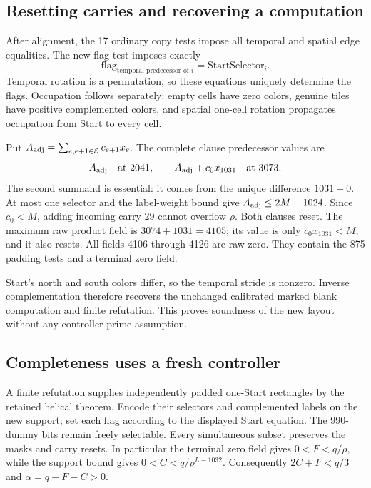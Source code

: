\documentclass[10pt,letterpaper]{article}
\theoremstyle{remark}\newtheorem{remark}[theorem]{Remark}
\begin{document}
\subsection{Resetting carries and recovering a computation}

After alignment, the 17 ordinary copy tests impose all temporal and
spatial edge equalities. The new flag test imposes exactly
\[
 \mathrm{flag}_{\text{temporal predecessor of }i}
     =\mathrm{StartSelector}_i.
\]
Temporal rotation is a permutation, so these equations uniquely determine
the flags. Occupation follows separately: empty cells have zero colors,
genuine tiles have positive complemented colors, and spatial one-cell
rotation propagates occupation from Start to every cell.

Put $A_{\rm adj}=\sum_{e,e+1\in\mathcal E}c_{e+1}x_e$. The complete
clause predecessor values are
\[
 A_{\rm adj}\quad\text{at 2041},\qquad
 A_{\rm adj}+c_0x_{1031}\quad\text{at 3073}.
\]
The second summand is essential: it comes from the unique difference
$1031-0$. At most one selector and the label-weight bound give
$A_{\rm adj}\le2M-1024$. Since $c_0<M$, adding incoming carry 29 cannot
overflow $\rho$. Both clauses reset. The maximum raw product field is
$3074+1031=4105$; its value is only $c_0x_{1031}<M$, and it also resets.
All fields 4106 through 4126 are raw zero. They contain the 875 padding
tests and a terminal zero field.

Start's north and south colors differ, so the temporal stride is nonzero.
Inverse complementation therefore recovers the unchanged calibrated
marked blank computation and finite refutation. This proves soundness of
the new layout without any controller-prime assumption.

\subsection{Completeness uses a fresh controller}

A finite refutation supplies independently padded one-Start rectangles
by the retained helical theorem. Encode their selectors and complemented
labels on the new support; set each flag according to the displayed
Start equation. The 990-dummy bits remain freely selectable. Every
simultaneous subset preserves the masks and carry resets. In particular
the terminal zero field gives $0<F<q/\rho$, while the support bound gives
$0<C<q/\rho^{L-1032}$. Consequently $2C+F<q/3$ and
$\alpha=q-F-C>0$.
\end{document}
